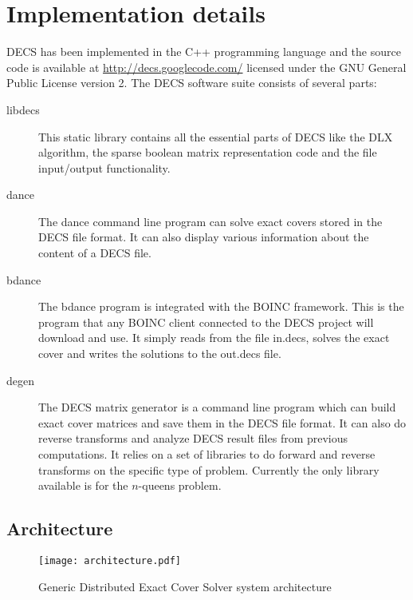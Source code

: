 
\chapter{Implementation details}
\label{implementation}

DECS has been implemented in the C++ programming language and the source code is available at \url{http://decs.googlecode.com/} licensed under the GNU General Public License version 2.
The DECS software suite consists of several parts:
\begin{description}
	\item[libdecs]
		This static library contains all the essential parts of DECS like the DLX algorithm, the sparse boolean matrix representation code and the file input/output functionality.
	\item[dance]
		The dance command line program can solve exact covers stored in the DECS file format.
		It can also display various information about the content of a DECS file.
	\item[bdance]
		The bdance program is integrated with the BOINC framework.
		This is the program that any BOINC client connected to the DECS project will download and use.
		It simply reads from the file in.decs, solves the exact cover and writes the solutions to the out.decs file.
	\item[degen]
		The DECS matrix generator is a command line program which can build exact cover matrices and save them in the DECS file format.
		It can also do reverse transforms and analyze DECS result files from previous computations.
		It relies on a set of libraries to do forward and reverse transforms on the specific type of problem.
		Currently the only library available is for the $n$-queens problem.
\end{description}



\section{Architecture}

\begin{figure}[htbp]
	\centering 
	\texttt{[image: architecture.pdf]}
	\caption{Generic Distributed Exact Cover Solver system architecture}
	\label{fig:architecture}
\end{figure}

